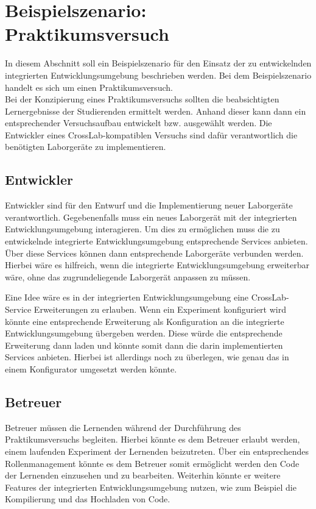\section{Beispielszenario: Praktikumsversuch} \label{beispielszenario}

In diesem Abschnitt soll ein Beispielszenario für den Einsatz der zu entwickelnden integrierten Entwicklungsumgebung beschrieben werden. Bei dem Beispielszenario handelt es sich um einen Praktikumsversuch. \\

Bei der Konzipierung eines Praktikumsversuchs sollten die beabsichtigten Lernergebnisse der Studierenden ermittelt werden. Anhand dieser kann dann ein entsprechender Versuchsaufbau entwickelt bzw. ausgewählt werden. Die Entwickler eines CrossLab-kompatiblen Versuchs sind dafür verantwortlich die benötigten Laborgeräte zu implementieren.

\subsection{Entwickler}

Entwickler sind für den Entwurf und die Implementierung neuer Laborgeräte verantwortlich. Gegebenenfalls muss ein neues Laborgerät mit der integrierten Entwicklungsumgebung interagieren. Um dies zu ermöglichen muss die zu entwickelnde integrierte Entwicklungsumgebung entsprechende Services anbieten. Über diese Services können dann entsprechende Laborgeräte verbunden werden. Hierbei wäre es hilfreich, wenn die integrierte Entwicklungsumgebung erweiterbar wäre, ohne das zugrundeliegende Laborgerät anpassen zu müssen.

\begin{note}
    Eine Idee wäre es in der integrierten Entwicklungsumgebung eine CrossLab-Service Erweiterungen zu erlauben. Wenn ein Experiment konfiguriert wird könnte eine entsprechende Erweiterung als Konfiguration an die integrierte Entwicklungsumgebung übergeben werden. Diese würde die entsprechende Erweiterung dann laden und könnte somit dann die darin implementierten Services anbieten. Hierbei ist allerdings noch zu überlegen, wie genau das in einem Konfigurator umgesetzt werden könnte.
\end{note}

\subsection{Betreuer}

Betreuer müssen die Lernenden während der Durchführung des Praktikumsversuchs begleiten. Hierbei könnte es dem Betreuer erlaubt werden, einem laufenden Experiment der Lernenden beizutreten. Über ein entsprechendes Rollenmanagement könnte es dem Betreuer somit ermöglicht werden den Code der Lernenden einzusehen und zu bearbeiten. Weiterhin könnte er weitere Features der integrierten Entwicklungsumgebung nutzen, wie zum Beispiel die Kompilierung und das Hochladen von Code.

